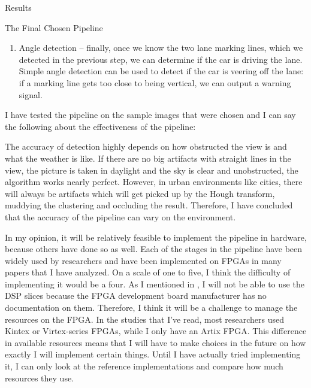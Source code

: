 \documentclass{matthijs}
\begin{document}
\begin{hoofdstuk}{Results}
\begin{paragraaf}{The Final Chosen Pipeline}
\begin{enumerate}
					I choose to use two-means clustering to achieve this using Lloyd's algorithm over DBSCAN because the former only requires one parameter -- the amount of clusters -- which we know beforehand.
					The parameters used in DBSCAN clustering depend on a given situation and need to be configured afterwards, making it harder to implement.
				\item	Angle detection -- finally, once we know the two lane marking lines, which we detected in the previous step, we can determine if the car is driving the lane.
					Simple angle detection can be used to detect if the car is veering off the lane: if a marking line gets too close to being vertical, we can output a warning signal.

			\end{enumerate}

			I have tested the pipeline on the sample images that were chosen and I can say the following about the effectiveness of the pipeline:

			\bigskip

			The accuracy of detection highly depends on how obstructed the view is and what the weather is like.
			If there are no big artifacts with straight lines in the view, the picture is taken in daylight and the sky is clear and unobstructed, the algorithm works nearly perfect.
			However, in urban environments like cities, there will always be artifacts which will get picked up by the Hough transform, muddying the clustering and occluding the result.
			Therefore, I have concluded that the accuracy of the pipeline can vary on the environment.

			\bigskip

			In my opinion, it will be relatively feasible to implement the pipeline in hardware, because others have done so as well.
			Each of the stages in the pipeline have been widely used by researchers and have been implemented on FPGAs in many papers that I have analyzed.
			On a scale of one to five, I think the difficulty of implementing it would be a four.
			As I mentioned in , I will not be able to use the DSP slices because the FPGA development board manufacturer has no documentation on them.
			Therefore, I think it will be a challenge to manage the resources on the FPGA.
			In the studies that I've read, most researchers used Kintex or Virtex-series FPGAs, while I only have an Artix FPGA.
			This difference in available resources means that I will have to make choices in the future on how exactly I will implement certain things.
			Until I have actually tried implementing it, I can only look at the reference implementations and compare how much resources they use.

		\end{paragraaf}

	\end{hoofdstuk}
\end{document}
